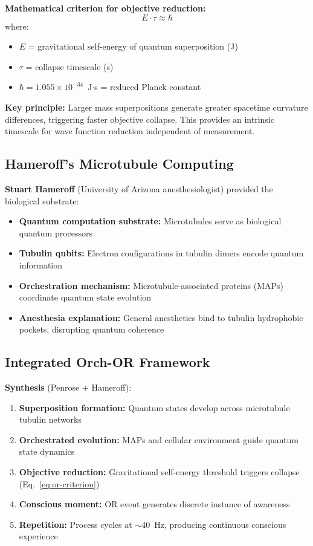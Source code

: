 \textbf{Mathematical criterion for objective reduction:}
\begin{equation}
\label{eq:or-criterion}
E \cdot \tau \approx \hbar
\end{equation}
where:
\begin{itemize}
\item $E$ = gravitational self-energy of quantum superposition (J)
\item $\tau$ = collapse timescale (s)
\item $\hbar = 1.055 \times 10^{-34}$~J$\cdot$s = reduced Planck constant
\end{itemize}

\textbf{Key principle:} Larger mass superpositions generate greater spacetime curvature differences, triggering faster objective collapse. This provides an intrinsic timescale for wave function reduction independent of measurement.

\subsection{Hameroff's Microtubule Computing}

\textbf{Stuart Hameroff} (University of Arizona anesthesiologist) provided the biological substrate:

\begin{itemize}
\item \textbf{Quantum computation substrate:} Microtubules serve as biological quantum processors
\item \textbf{Tubulin qubits:} Electron configurations in tubulin dimers encode quantum information
\item \textbf{Orchestration mechanism:} Microtubule-associated proteins (MAPs) coordinate quantum state evolution
\item \textbf{Anesthesia explanation:} General anesthetics bind to tubulin hydrophobic pockets, disrupting quantum coherence
\end{itemize}

\subsection{Integrated Orch-OR Framework}

\textbf{Synthesis} (Penrose $+$ Hameroff):

\begin{enumerate}
\item \textbf{Superposition formation:} Quantum states develop across microtubule tubulin networks
\item \textbf{Orchestrated evolution:} MAPs and cellular environment guide quantum state dynamics
\item \textbf{Objective reduction:} Gravitational self-energy threshold triggers collapse (Eq.~\ref{eq:or-criterion})
\item \textbf{Conscious moment:} OR event generates discrete instance of awareness
\item \textbf{Repetition:} Process cycles at $\sim$40~Hz, producing continuous conscious experience
\end{enumerate}

